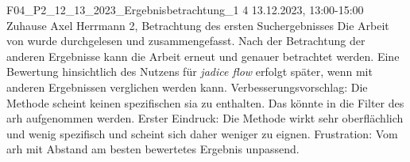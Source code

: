 \fieldnote
{F04\_P2\_12\_13\_2023\_Ergebnisbetrachtung\_1}
{4}
{13.12.2023, 13:00-15:00}
{Zuhause}
{Axel Herrmann}
{2, Betrachtung des ersten Suchergebnisses}
{
	Die Arbeit von  wurde durchgelesen und zusammengefasst.
}
{
	Nach der Betrachtung der anderen Ergebnisse kann die Arbeit erneut und genauer betrachtet werden.
	Eine Bewertung hinsichtlich des Nutzens für \emph{jadice flow} erfolgt später, wenn mit anderen Ergebnissen verglichen werden kann.
  Verbesserungsvorschlag: Die Methode scheint keinen spezifischen \gls{sia} zu enthalten. Das könnte in die Filter des \gls{arh} aufgenommen werden.
}
{
}
{
  Erster Eindruck: Die Methode wirkt sehr oberflächlich und wenig spezifisch und scheint sich daher weniger zu eignen.
}
{
  Frustration: Vom \gls{arh} mit Abstand am besten bewertetes Ergebnis unpassend.
}
